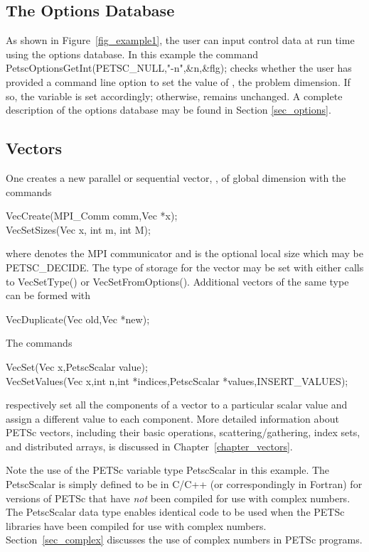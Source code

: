\subsection*{The Options Database}

As shown in Figure~\ref{fig_example1}, the user can input control data
at run time using the options database. In this example the command
PetscOptionsGetInt(PETSC\_NULL,"-n",\&n,\&flg); checks whether the user has
provided a command line option to set the value of , the
problem dimension.  If so, the variable  is set accordingly;
otherwise,  remains unchanged. A complete description of the
options database may be found in Section \ref{sec_options}.

\subsection*{Vectors}
\label{sec_vecintro}

One creates a new parallel or
sequential vector, , of global dimension  with the
commands  
\begin{tabbing}
  VecCreate(MPI\_Comm comm,Vec *x);\\
  VecSetSizes(Vec x, int m, int M);
\end{tabbing}
where  denotes the MPI communicator and  is the optional local size
which may be PETSC\_DECIDE. The type of storage
for the vector may be set with either calls to
VecSetType() or VecSetFromOptions().
Additional vectors of the same type can be formed with
\begin{tabbing}
  VecDuplicate(Vec old,Vec *new);
\end{tabbing}
The commands
\begin{tabbing}
  VecSet(Vec x,PetscScalar value);\\
  VecSetValues(Vec x,int n,int *indices,PetscScalar *values,INSERT\_VALUES);
\end{tabbing}
respectively set all the components of a vector to a particular scalar
value and assign a different value to each component.  More
detailed information about PETSc vectors, including their basic
operations, scattering/gathering, index sets, and distributed arrays, is
discussed in Chapter~\ref{chapter_vectors}.

Note the use of the PETSc variable type PetscScalar in this example.
The PetscScalar is simply defined to be  in C/C++
(or correspondingly   in Fortran) for versions of
PETSc that have {\em not} been compiled for use with complex numbers.
The PetscScalar data type enables
identical code to be used when the PETSc libraries have been compiled
for use with complex numbers.  Section~\ref{sec_complex} discusses the
use of complex numbers in PETSc programs.

